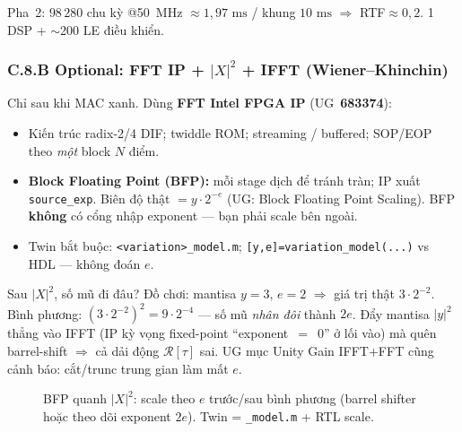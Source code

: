\begin{costbox}
Pha~2: $98\,280$ chu kỳ @50~MHz $\approx 1{,}97\text{ ms}$ / khung $10\text{ ms}$ $\Rightarrow$ RTF$\approx 0{,}2$. 1 DSP + $\sim$200 LE điều khiển.
\end{costbox}

\subsubsection*{C.8.B Optional: FFT IP + $|X|^2$ + IFFT (Wiener--Khinchin)}

Chỉ sau khi MAC xanh. Dùng \textbf{FFT Intel FPGA IP} (UG~\textbf{683374}):
\begin{itemize}[leftmargin=*,itemsep=1pt]
  \item Kiến trúc radix-2/4 DIF; twiddle ROM; streaming / buffered; SOP/EOP theo \emph{một} block $N$ điểm.
  \item \textbf{Block Floating Point (BFP):} mỗi stage dịch để tránh tràn; IP xuất \texttt{source\_exp}. Biên độ thật $= y\cdot 2^{-e}$ (UG: Block Floating Point Scaling). BFP \textbf{không} có cổng nhập exponent --- bạn phải scale bên ngoài.
  \item Twin bắt buộc: \texttt{<variation>\_model.m}; \texttt{[y,e]=variation\_model(...)} vs HDL --- không đoán $e$.
\end{itemize}

\begin{firstprin}{Sau $|X|^2$, số mũ đi đâu?}
Đồ chơi: mantisa $y=3$, $e=2$ $\Rightarrow$ giá trị thật $3\cdot 2^{-2}$. Bình phương: $(3\cdot 2^{-2})^2 = 9\cdot 2^{-4}$ --- số mũ \emph{nhân đôi} thành $2e$. Đẩy mantisa $|y|^2$ thẳng vào IFFT (IP kỳ vọng fixed-point ``exponent~$=$~0'' ở lối vào) mà quên barrel-shift $\Rightarrow$ cả dải động $\mathcal{R}[\tau]$ sai. UG mục Unity Gain IFFT+FFT cũng cảnh báo: cắt/trunc trung gian làm mất $e$.
\end{firstprin}

\begin{figure}[H]
\centering
{}
\caption{BFP quanh $|X|^2$: scale theo $e$ trước/sau bình phương (barrel shifter hoặc theo dõi exponent $2e$). Twin = \texttt{\_model.m} + RTL scale.}
\label{fig:fft_wk_bfp}
\end{figure}

